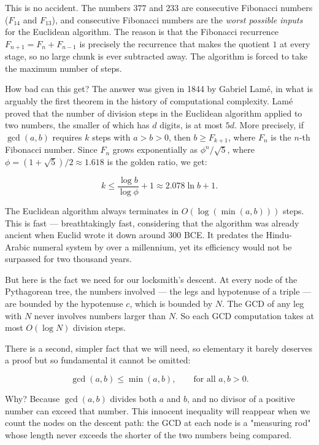 This is no accident. The numbers $377$ and $233$ are consecutive Fibonacci numbers ($F_{14}$ and $F_{13}$), and consecutive Fibonacci numbers are the \textit{worst possible inputs} for the Euclidean algorithm. The reason is that the Fibonacci recurrence $F_{n+1} = F_n + F_{n-1}$ is precisely the recurrence that makes the quotient $1$ at every stage, so no large chunk is ever subtracted away. The algorithm is forced to take the maximum number of steps.

How bad can this get? The answer was given in 1844 by Gabriel Lam\'e, in what is arguably the first theorem in the history of computational complexity. Lam\'e proved that the number of division steps in the Euclidean algorithm applied to two numbers, the smaller of which has $d$ digits, is at most $5d$. More precisely, if $\gcd(a, b)$ requires $k$ steps with $a > b > 0$, then $b \ge F_{k+1}$, where $F_n$ is the $n$-th Fibonacci number. Since $F_n$ grows exponentially as $\phi^n / \sqrt{5}$, where $\phi = (1 + \sqrt{5})/2 \approx 1.618$ is the golden ratio, we get:

\[
k \le \frac{\log b}{\log \phi} + 1 \approx 2.078 \ln b + 1.
\]

The Euclidean algorithm always terminates in $O(\log(\min(a, b)))$ steps. This is fast --- breathtakingly fast, considering that the algorithm was already ancient when Euclid wrote it down around 300 BCE. It predates the Hindu-Arabic numeral system by over a millennium, yet its efficiency would not be surpassed for two thousand years.

But here is the fact we need for our locksmith's descent. At every node of the Pythagorean tree, the numbers involved --- the legs and hypotenuse of a triple --- are bounded by the hypotenuse $c$, which is bounded by $N$. The GCD of any leg with $N$ never involves numbers larger than $N$. So each GCD computation takes at most $O(\log N)$ division steps.

There is a second, simpler fact that we will need, so elementary it barely deserves a proof but so fundamental it cannot be omitted:

\[
\gcd(a, b) \le \min(a, b), \qquad \text{for all } a, b > 0.
\]

Why? Because $\gcd(a, b)$ divides both $a$ and $b$, and no divisor of a positive number can exceed that number. This innocent inequality will reappear when we count the nodes on the descent path: the GCD at each node is a "measuring rod" whose length never exceeds the shorter of the two numbers being compared.

